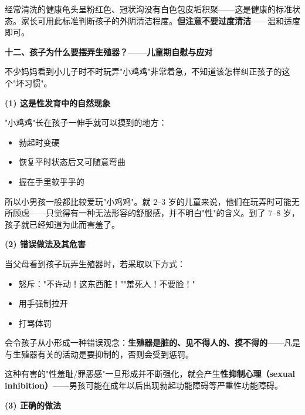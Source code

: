\documentclass[12pt,a4paper,twoside]{ctexbook}
\begin{document}
\begin{tcolorbox}[colback=pink!5!white,colframe=red!50!black,title=贴心小叮咛]
经常清洗的健康龟头呈粉红色、冠状沟没有白色包皮垢积聚——这是健康的标准状态。家长可用此标准判断孩子的外阴清洁程度。\textbf{但注意不要过度清洁}——温和适度即可。
\end{tcolorbox}

\vspace{0.8em}
\noindent\textbf{十二、孩子为什么要摆弄生殖器？——儿童期自慰与应对}

不少妈妈看到小儿子时不时玩弄"小鸡鸡"非常着急，不知道该怎样纠正孩子的这个"坏习惯"。

\vspace{0.3em}
\noindent\textbf{(1) 这是性发育中的自然现象}

"小鸡鸡"长在孩子一伸手就可以摸到的地方：
\begin{itemize}
	\item 勃起时变硬
	\item 恢复平时状态后又可随意弯曲
	\item 握在手里软乎乎的
\end{itemize}

所以小男孩一般都比较爱玩"小鸡鸡"。就 $2$--$3$ 岁的儿童来说，他们在玩弄时可能无所顾虑——只觉得有一种无法形容的舒服感，并不明白"性"的含义。到了 $7$--$8$ 岁，孩子就已经知道为此而害羞了。

\vspace{0.3em}
\noindent\textbf{(2) 错误做法及其危害}

当父母看到孩子玩弄生殖器时，若采取以下方式：
\begin{itemize}
	\item 怒斥："不许动！这东西脏！""羞死人！不要脸！"
	\item 用手强制拉开
	\item 打骂体罚
\end{itemize}

会令孩子从小形成一种错误观念：\textbf{生殖器是脏的、见不得人的、摸不得的}——凡是与生殖器有关的活动是要抑制的，否则会受到惩罚。

这种有害的"性羞耻/罪恶感"一旦形成并不断强化，就会产生\textbf{性抑制心理（sexual inhibition）}——男孩可能在成年以后出现勃起功能障碍等严重性功能障碍。

\vspace{0.3em}
\noindent\textbf{(3) 正确的做法}
\end{document}
